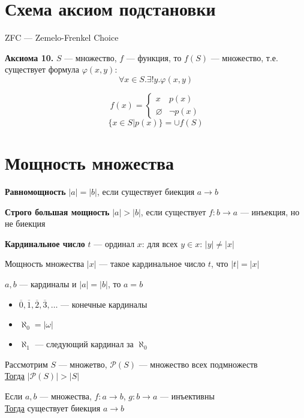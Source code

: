 \documentclass[english]{article}
\begin{document}
\section{Схема аксиом подстановки}
\label{sec:orgdae2d8e}
ZFC --- Zemelo-Frenkel Choice \\
\begin{axiom*}{\bf Аксиома 10.}
	\(S\) --- множество, \(f\) --- функция, то \(f(S)\) --- множество, т.е. существует формула \(\varphi(x, y)\):
	\[\forall x \in S. \exists ! y. \varphi(x, y)\]
\end{axiom*}
\begin{examp}
	\[ f(x) = \begin{cases} {x} & p(x) \\ \varnothing & \neg p(x) \end{cases} \]
	\[ \{x \in S | p(x)\} = \cup f(S) \]
\end{examp}
\section{Мощность множества}
\label{sec:org48f1cd7}
\begin{definition}
	\textbf{Равномощность} \(|a| = |b|\), если существует биекция \(a \to b\)
	\label{orgb146a76}
\end{definition}
\begin{definition}
	\textbf{Строго большая мощность} \(|a| > |b|\), если существует \(f: b \to a\) --- инъекция, но не биекция
	\label{orgf0ca17d}
\end{definition}
\begin{definition}
	\textbf{Кардинальное число} \(t\) --- ординал \(x\): для всех \(y \in x\): \(|y| \neq |x|\)
	\label{org344ccbd}
\end{definition}
\begin{definition}
	Мощность множества \(|x|\) --- такое кардинальное число \(t\), что \(|t| = |x|\)
	\label{org63a54bc}
\end{definition}
\begin{lemma}
	\(a, b\) --- кардиналы и \(|a| = |b|\), то \(a = b\)
\end{lemma}
\begin{remark}
	\-
	\begin{itemize}
		\item \(\overline{0}, \overline{1}, \overline{2}, \overline{3}, \dots\) --- конечные кардиналы
		\item \(\aleph_0 = |\omega|\)
		\item \(\aleph_1\) --- следующий кардинал за \(\aleph_0\)
	\end{itemize}
	\label{orgdcb9b59}
\end{remark}
\begin{theorem}[Кантора]
	Рассмотрим \(S\) --- множетво, \(\mathcal{P}(S)\) --- множество всех подмножеств \\
	\uline{Тогда} \(|\mathcal{P}(S)| > |S|\)
	\label{org5574f0a}
\end{theorem}
\begin{theorem}
	Если \(a, b\) --- множества, \(f: a \to b\), \(g: b \to a\) --- инъективны \\
	\uline{Тогда} существует биекция \(a \to b\)
	\label{org3ec2ede}
\end{theorem}
\end{document}
